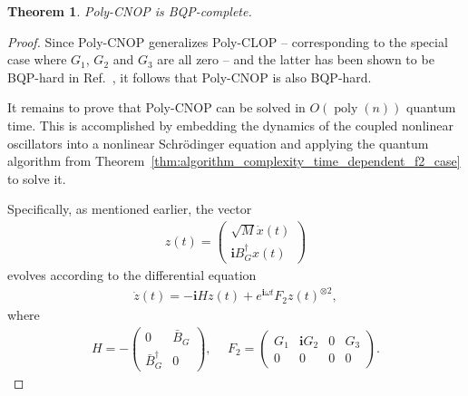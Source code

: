 \documentclass[superscriptaddress,onecolumn,nofootinbib,longbibliography,a4paper,accepted=2026-09-29]{quantumarticle}
\theoremstyle{plain}
\newtheorem{thm}{Theorem}
\theoremstyle{definition}
\numberwithin{thm}{section}
\numberwithin{assumption}{section}
\numberwithin{lemma}{section}
\numberwithin{prop}{section}
\numberwithin{cor}{section}
\numberwithin{definition}{section}
\numberwithin{rmk}{section}
\numberwithin{equation}{section}
\newcommand{\lrb}[1]{\left ( #1 \right )}
\renewcommand{\i}{\ensuremath{\mathbf{i}}}
\newcommand{\mypoly}[1]{\operatorname{poly} \lrb{#1}}
\newcommand{\myO}[1]{O\lrb{#1}}
\begin{document}
\begin{thm}
Poly-CNOP is BQP-complete.
\end{thm}

\begin{proof}
Since Poly-CNOP generalizes Poly-CLOP -- corresponding to the special case where $G_1$, $G_2$ and $G_3$ are all zero -- and the latter has been shown to be BQP-hard in Ref.~\cite{babbush2023exponential}, it follows that Poly-CNOP is also BQP-hard.

It remains to prove that Poly-CNOP can be solved in $\myO{\mypoly{n}}$ quantum time. This is accomplished by embedding the dynamics of the coupled nonlinear oscillators into a nonlinear Schr\"{o}dinger equation and applying the quantum algorithm from Theorem~\ref{thm:algorithm_complexity_time_dependent_f2_case} to solve it.

Specifically, as mentioned earlier, the vector
\begin{align}
z(t)=\begin{pmatrix}
    \sqrt{M}\dot{x}(t)\\
    \i B_G^\dagger x(t)
\end{pmatrix} 
\end{align}
evolves according to the differential equation
\begin{align}
\dot{z}(t) = -\i H z(t) + e^{\i \omega t} F_2 z(t)^{\otimes 2},    
\label{eq:nonlinear_schrodinger_equation_for_nonlinear_oscillators}
\end{align}
where
\begin{align}
H = -\begin{pmatrix}
0 & \bar{B}_G \\
\bar{B}_G^{\dagger} & 0
\end{pmatrix},~&~
F_2=\begin{pmatrix}
    G_1 & \i G_2 & 0 & G_3 \\
    0 & 0 & 0 & 0
\end{pmatrix}. 
\end{align}


\end{proof}
\end{document}
